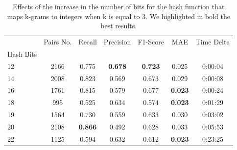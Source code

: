 \documentclass[runningheads]{llncs}
\begin{document}
\begin{table}
  \caption{Effects of the increase in the number of bits for the hash function that maps k-grams to integers when k is equal to 3. We highlighted in bold the best results.}
  \label{tab:experiments:buckets_k3}
  \centering
  \begin{tabular}{lcccccc}
    \toprule
    {} &  Pairs No. &  Recall &  Precision &  F1-Score &    MAE & Time Delta \\
    Hash Bits &            &         &            &           &        &            \\
    \midrule
    12        &       2166 &   0.775 &      \textbf{0.678} &     \textbf{0.723} &  0.025 &    0:00:04 \\
    14        &       2008 &   0.823 &      0.569 &     0.673 &  0.029 &    0:00:08 \\
    16        &       1761 &   0.815 &      0.579 &     0.677 &  \textbf{0.023} &    0:00:24 \\
    18        &        995 &   0.525 &      0.634 &     0.574 &  \textbf{0.023} &    0:01:29 \\
    19        &       1564 &   0.730 &      0.559 &     0.633 &  0.030 &    0:03:02 \\
    20        &       2108 &   \textbf{0.866} &      0.492 &     0.628 &  0.033 &    0:05:53 \\
    22        &       1125 &   0.594 &      0.632 &     0.612 &  \textbf{0.023} &    0:23:25 \\
    \bottomrule
    \end{tabular}
\end{table}
\end{document}
